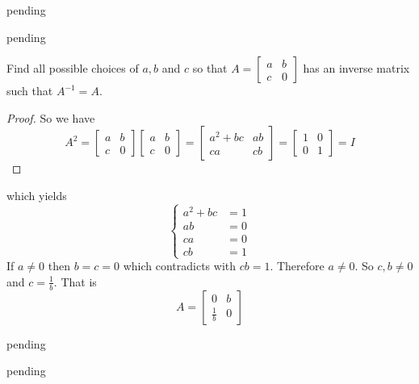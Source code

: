 \begin{exercise} \label{E.1.15}
    pending
\end{exercise}

\begin{exercise} \label{E.1.16}
    pending
\end{exercise}

\begin{exercise} \label{E.1.17}
    Find all possible choices of \( a, b \) and \( c \) so that \( A = \begin{bmatrix} a & b \\ c & 0 \end{bmatrix} \) has an inverse matrix such that \( A^{-1} = A \).
    
    \begin{proof}
        So we have
        \[ A^2 = \begin{bmatrix} a & b \\ c & 0 \end{bmatrix} \begin{bmatrix} a & b \\ c & 0 \end{bmatrix} = \begin{bmatrix} a^2 + bc & ab \\ ca & cb \end{bmatrix} = \begin{bmatrix} 1 & 0 \\ 0 & 1 \end{bmatrix} = I \]
    \end{proof}
    which yields
    \[ 
    \begin{cases}
        a^2 + bc &= 1 \\
        ab &= 0 \\
        ca &= 0 \\
        cb &= 1
    \end{cases}
    \]
    If \( a \neq 0 \) then \( b = c = 0 \) which contradicts with \( cb = 1 \). Therefore \( a \neq 0 \). So \( c,b \neq 0 \) and \( c = \frac{1}{b} \). That is
    \[ A = \begin{bmatrix} 0 & b \\ \frac{1}{b} & 0 \end{bmatrix} \]
\end{exercise}

\begin{exercise} \label{E.1.18}
    pending
\end{exercise}

\begin{exercise} \label{E.1.19}
    pending
\end{exercise}

